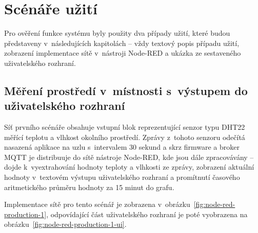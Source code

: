 \section{Scénáře užití}\label{sec:scenare-uziti}

Pro ověření funkce systému byly použity dva případy užití, které budou představeny v~následujících kapitolách -- vždy
textový popis případu užití, zobrazení implementace sítě v~nástroji Node-RED a ukázka ze sestaveného uživatelského
rozhraní.

\subsection{Měření prostředí v~místnosti s~výstupem do uživatelského rozhraní}\label{subsec:scenar-1}

Síť prvního scénáře obsahuje vstupní blok reprezentující senzor typu DHT22 měřící teplotu a vlhkost okolního prostředí.
Zprávy z~tohoto senzoru odečítá nasazená aplikace na uzlu s~intervalem 30 sekund a skrz firmware a broker MQTT je
distribuuje do sítě nástroje Node-RED, kde jsou dále zpracovávány -- dojde
k~vyextrahování hodnoty teploty a vlhkosti ze zprávy, zobrazení aktuální hodnoty v~textovém výstupu uživatelského
rozhraní a promítnutí časového aritmetického průměru hodnoty za 15 minut do grafu.

Implementace sítě pro tento scénář je zobrazena v~obrázku~\ref{fig:node-red-production-1}, odpovídající část
uživatelského rozhraní je poté vyobrazena na obrázku~\ref{fig:node-red-production-1-ui}.


